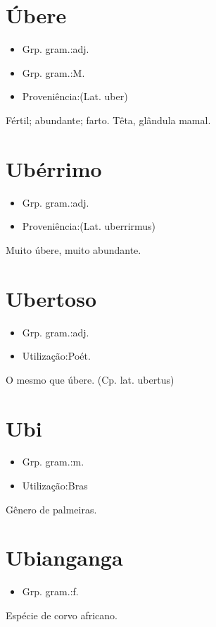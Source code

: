 \documentclass{article}
\begin{document}
\section{Úbere}
\begin{itemize}
\item {Grp. gram.:adj.}
\end{itemize}
\begin{itemize}
\item {Grp. gram.:M.}
\end{itemize}
\begin{itemize}
\item {Proveniência:(Lat. \textunderscore uber\textunderscore )}
\end{itemize}
Fértil; abundante; farto.
Têta, glândula mamal.
\section{Ubérrimo}
\begin{itemize}
\item {Grp. gram.:adj.}
\end{itemize}
\begin{itemize}
\item {Proveniência:(Lat. \textunderscore uberrirmus\textunderscore )}
\end{itemize}
Muito úbere, muito abundante.
\section{Ubertoso}
\begin{itemize}
\item {Grp. gram.:adj.}
\end{itemize}
\begin{itemize}
\item {Utilização:Poét.}
\end{itemize}
O mesmo que \textunderscore úbere\textunderscore .
(Cp. lat. \textunderscore ubertus\textunderscore )
\section{Ubi}
\begin{itemize}
\item {Grp. gram.:m.}
\end{itemize}
\begin{itemize}
\item {Utilização:Bras}
\end{itemize}
Gênero de palmeiras.
\section{Ubianganga}
\begin{itemize}
\item {Grp. gram.:f.}
\end{itemize}
Espécie de corvo africano.
\end{document}
